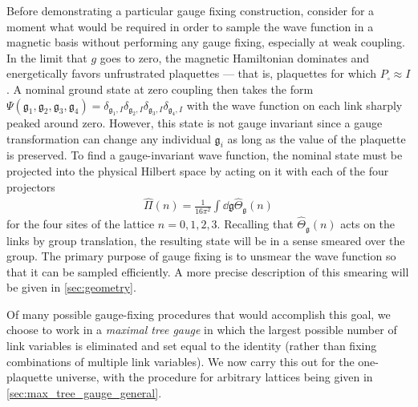 \documentclass[reprint,superscriptaddress,pra,nofootinbib,preprintnumbers,floatfix]{revtex4-1}
\providecommand{\g}{{\mathfrak{g}}}
\begin{document}
Before demonstrating a particular gauge fixing construction, consider for a moment what would be required in order to sample the wave function in a magnetic basis without performing any gauge fixing, especially at weak coupling. 
%
In the limit that $g$ goes to zero, the magnetic Hamiltonian dominates and energetically favors unfrustrated plaquettes --- that is, plaquettes for which $P_{\square} \approx I$. 
%
A nominal ground state at zero coupling then takes the form $\Psi(\g_1, \g_2, \g_3, \g_4) = \delta_{\g_1,I} \delta_{\g_2,I} \delta_{\g_3,I} \delta_{\g_4, I}$ with the wave function on each link sharply peaked around zero. 
%
However, this state is not gauge invariant since a gauge transformation can change any individual $\g_i$ as long as the value of the plaquette is preserved. 
%
To find a gauge-invariant wave function, the nominal state must be projected into the physical Hilbert space by acting on it with each of the four projectors \cite{Haegeman2015}
%
\begin{align}
\label{eq:projector}
    \hat{\Pi}(n) = \frac{1}{16 \pi^2} \int\dd{\g} \hat{\Theta}_{\g}(n)
\end{align}
%
for the four sites of the lattice $n=0,1,2,3$.
%
Recalling that $\hat \Theta_\g(n)$ acts on the links by group translation, the resulting state will be in a sense smeared over the group.
%
The primary purpose of gauge fixing is to unsmear the wave function so that it can be sampled efficiently. A more precise description of this smearing will be given in \cref{sec:geometry}.

Of many possible gauge-fixing procedures that would accomplish this goal, we choose to work in a \emph{maximal tree gauge} in which the largest possible number of link variables is eliminated and set equal to the identity (rather than fixing combinations of multiple link variables).
%
We now carry this out for the one-plaquette universe, with the procedure for arbitrary lattices being given in \cref{sec:max_tree_gauge_general}. 
\end{document}
